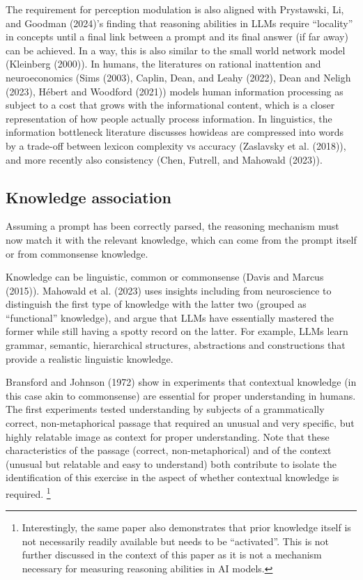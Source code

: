 \documentclass[
]{article}
\begin{document}
The requirement for perception modulation is also aligned with
Prystawski, Li, and Goodman (2024)'s finding that reasoning abilities in
LLMs require ``locality'' in concepts until a final link between a
prompt and its final answer (if far away) can be achieved. In a way,
this is also similar to the small world network model (Kleinberg
(2000)). In humans, the literatures on rational inattention and
neuroeconomics (Sims (2003), Caplin, Dean, and Leahy (2022), Dean and
Neligh (2023), Hébert and Woodford (2021)) models human information
processing as subject to a cost that grows with the informational
content, which is a closer representation of how people actually process
information. In linguistics, the information bottleneck literature
discusses howideas are compressed into words by a trade-off between
lexicon complexity vs accuracy (Zaslavsky et al. (2018)), and more
recently also consistency (Chen, Futrell, and Mahowald (2023)).

\subsection{Knowledge association}\label{knowledge-association}

Assuming a prompt has been correctly parsed, the reasoning mechanism
must now match it with the relevant knowledge, which can come from the
prompt itself or from commonsense knowledge.

Knowledge can be linguistic, common or commonsense (Davis and Marcus
(2015)). Mahowald et al. (2023) uses insights including from
neuroscience to distinguish the first type of knowledge with the latter
two (grouped as ``functional'' knowledge), and argue that LLMs have
essentially mastered the former while still having a spotty record on
the latter. For example, LLMs learn grammar, semantic, hierarchical
structures, abstractions and constructions that provide a realistic
linguistic knowledge.

Bransford and Johnson (1972) show in experiments that contextual
knowledge (in this case akin to commonsense) are essential for proper
understanding in humans. The first experiments tested understanding by
subjects of a grammatically correct, non-metaphorical passage that
required an unusual and very specific, but highly relatable image as
context for proper understanding. Note that these characteristics of the
passage (correct, non-metaphorical) and of the context (unusual but
relatable and easy to understand) both contribute to isolate the
identification of this exercise in the aspect of whether contextual
knowledge is required. \footnote{Interestingly, the same paper also
  demonstrates that prior knowledge itself is not necessarily readily
  available but needs to be ``activated''. This is not further discussed
  in the context of this paper as it is not a mechanism necessary for
  measuring reasoning abilities in AI models.}
\end{document}
